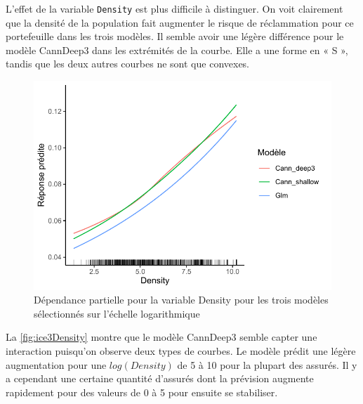 \begin{figure}
\begin{minipage}{0.45\linewidth}
\end{minipage}
\end{figure}



L'effet de la variable \verb=Density= est plus difficile à distinguer. On voit clairement que la densité de la population fait augmenter le risque de réclammation pour ce portefeuille dans les trois modèles. Il semble avoir une légère différence pour le modèle CannDeep3 dans les extrémités de la courbe. Elle a une forme en « S », tandis que les deux autres courbes ne sont que convexes.

\begin{figure}
\centering
\caption{\label{fig:pdp3Density} Dépendance partielle pour la variable Density pour les trois modèles sélectionnés sur l'échelle logarithmique }
\includegraphics[scale=0.9]{Graphiques/pdp3ModDensity}
\end{figure}


La \autoref{fig:ice3Density} montre que le modèle CannDeep3 semble capter une interaction puisqu'on observe deux types de courbes. Le modèle prédit une légère augmentation pour une $log(Density)$ de 5 à 10 pour la plupart des assurés. Il y a cependant une certaine quantité d'assurés dont la prévision augmente rapidement pour des valeurs de 0 à 5 pour ensuite se stabiliser.

